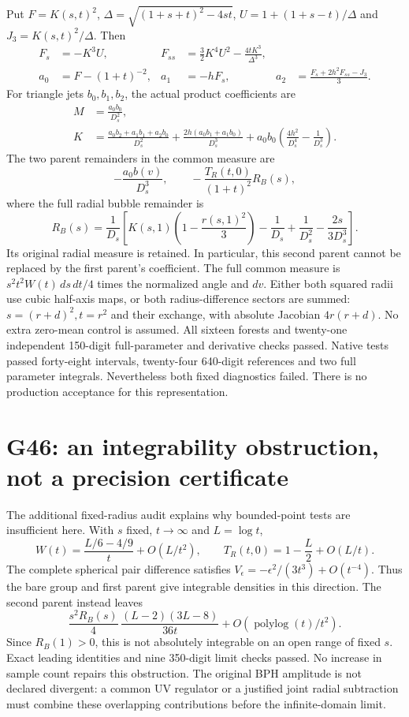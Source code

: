 \documentclass[11pt]{article}
\begin{document}
Put $F=K(s,t)^2$, $\Delta=\sqrt{(1+s+t)^2-4st}$,
$U=1+(1+s-t)/\Delta$ and $J_3=K(s,t)^2/\Delta$. Then
\begin{align*}
 F_s&=-K^3 U,& F_{ss}&=\frac32K^4U^2-\frac{4tK^3}{\Delta^3},\\
 a_0&=F-(1+t)^{-2},&a_1&=-hF_s,&
 a_2&=\frac{F_s+2h^2F_{ss}-J_3}{3}.
\end{align*}
For triangle jets $b_0,b_1,b_2$, the actual product coefficients are
\begin{align*}
 M&=\frac{a_0b_0}{D_s^2},\\
 K&=\frac{a_0b_2+a_1b_1+a_2b_0}{D_s^2}
    +\frac{2h(a_0b_1+a_1b_0)}{D_s^3}
    +a_0b_0\left(\frac{4h^2}{D_s^4}-\frac1{D_s^3}\right).
\end{align*}
The two parent remainders in the common measure are
\[
 -\frac{a_0 b(v)}{D_s^3},\qquad
 -\frac{T_R(t,0)}{(1+t)^2}R_B(s),
\]
where the full radial bubble remainder is
\[
 R_B(s)=\frac1{D_s}\left[
 K(s,1)\left(1-\frac{r(s,1)^2}{3}\right)-\frac1{D_s}
                         +\frac1{D_s^2}-\frac{2s}{3D_s^3}\right].
\]
Its original radial measure is retained. In particular, this second
parent cannot be replaced by the first parent's coefficient.
The full common measure is $s^2t^2W(t)\,ds\,dt/4$ times the normalized
angle and $dv$. Either both squared radii use cubic half-axis maps,
or both radius-difference sectors are summed:
$s=(r+d)^2,t=r^2$ and their exchange, with absolute Jacobian $4r(r+d)$.
No extra zero-mean control is assumed.
All sixteen forests and twenty-one independent 150-digit full-parameter
and derivative checks passed. Native tests passed forty-eight intervals,
twenty-four 640-digit references and two full parameter integrals.
Nevertheless both fixed diagnostics failed. There is no production
acceptance for this representation.

\section*{G46: an integrability obstruction, not a precision certificate}
The additional fixed-radius audit explains why bounded-point tests
are insufficient here. With $s$ fixed, $t\to\infty$ and $L=\log t$,
\[
 W(t)=\frac{L/6-4/9}{t}+O(L/t^2),\qquad
 T_R(t,0)=1-\frac L2+O(L/t).
\]
The complete spherical pair difference satisfies
$V_\epsilon=-\epsilon^2/(3t^3)+O(t^{-4})$.
Thus the bare group and first parent give integrable densities in
this direction. The second parent instead leaves
\[
 \frac{s^2R_B(s)}4\,
 \frac{(L-2)(3L-8)}{36t}+O(\operatorname{polylog}(t)/t^2).
\]
Since $R_B(1)>0$, this is not absolutely integrable on an open range
of fixed $s$. Exact leading identities and nine 350-digit limit
checks passed. No increase in sample count repairs this obstruction.
The original BPH amplitude is not declared divergent: a common UV
regulator or a justified joint radial subtraction must combine these
overlapping contributions before the infinite-domain limit.
\end{document}
